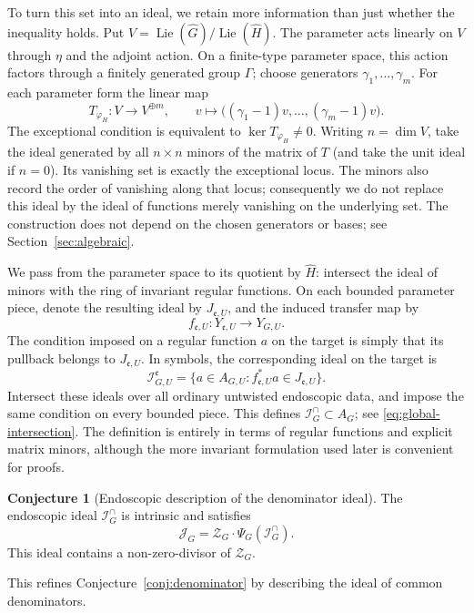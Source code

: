 \documentclass[11pt,a4paper]{amsart}
\DeclareMathOperator{\Lie}{Lie}
\newcommand{\mcZ}{\mathcal Z}
\newcommand{\mcJ}{\mathcal J}
\newcommand{\mcI}{\mathcal I}
\theoremstyle{definition}
\newtheorem{conjecture}[theorem]{Conjecture}
\theoremstyle{remark}
\newcommand{\Icap}{\mathcal I^{\cap}}
\begin{document}
To turn this set into an ideal, we retain more information than just
whether the inequality holds. Put
$V=\Lie(\widehat G)/\Lie(\widehat H)$. The parameter acts linearly
on $V$ through $\eta$ and the adjoint action. On a finite-type
parameter space, this action factors through a finitely generated
group $\Gamma$; choose generators $\gamma_1,\ldots,\gamma_m$.
For each parameter form the linear map
$$
 T_{\varphi_H}:V\longrightarrow V^{\oplus m},\qquad
 v\longmapsto\bigl((\gamma_1-1)v,\ldots,(\gamma_m-1)v\bigr).
$$
The exceptional condition is equivalent to $\ker T_{\varphi_H}\ne0$.
Writing $n=\dim V$, take the ideal generated by all $n\times n$
minors of the matrix of $T$ (and take the unit ideal if $n=0$).
Its vanishing set is exactly the exceptional locus. The minors also
record the order of vanishing along that locus; consequently we do
not replace this ideal by the ideal of functions merely vanishing on
the underlying set. The construction does not depend on the chosen
generators or bases; see Section~\ref{sec:algebraic}.

We pass from the parameter space to its quotient by $\widehat H$:
intersect the ideal of minors with the ring of invariant regular
functions. On each bounded parameter piece, denote the resulting
ideal by $J_{\mathfrak e,U}$, and the induced transfer map by
$$
 f_{\mathfrak e,U}:Y_{\mathfrak e,U}\longrightarrow Y_{G,U}.
$$
The condition imposed on a regular function $a$ on the target is
simply that its pullback belongs to $J_{\mathfrak e,U}$.
In symbols, the corresponding ideal on the target is
$$
 \mcI_{G,U}^{\mathfrak e}
   =\{a\in A_{G,U}:f_{\mathfrak e,U}^*a\in J_{\mathfrak e,U}\}.
$$
Intersect these ideals over all ordinary untwisted endoscopic data,
and impose the same condition on every bounded piece. This defines
$\Icap_G\subset A_G$; see \eqref{eq:global-intersection}.
The definition is entirely in terms of regular functions and explicit
matrix minors, although the more invariant formulation used later is
convenient for proofs.

\begin{conjecture}[Endoscopic description of the denominator ideal]
\label{conj:geometric}
The endoscopic ideal $\Icap_G$ is intrinsic and satisfies
\begin{equation}\label{eq:intersection-equality}
 {\mcJ_G=\mcZ_G\cdot\Psi_G(\Icap_G).}
\end{equation}
This ideal contains a non-zero-divisor of $\mcZ_G$.
\end{conjecture}
This refines Conjecture~\ref{conj:denominator} by describing the ideal
of common denominators.
\end{document}
